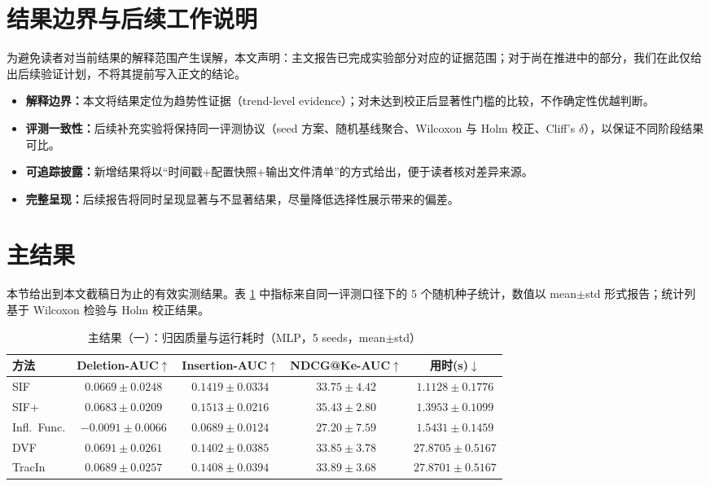 \section{结果边界与后续工作说明}
为避免读者对当前结果的解释范围产生误解，本文声明：主文报告已完成实验部分对应的证据范围；对于尚在推进中的部分，我们在此仅给出后续验证计划，不将其提前写入正文的结论。
\begin{itemize}
    \item \textbf{解释边界：}本文将结果定位为趋势性证据（trend-level evidence）；对未达到校正后显著性门槛的比较，不作确定性优越判断。
    \item \textbf{评测一致性：}后续补充实验将保持同一评测协议（seed 方案、随机基线聚合、Wilcoxon 与 Holm 校正、Cliff's $\delta$），以保证不同阶段结果可比。
    \item \textbf{可追踪披露：}新增结果将以“时间戳+配置快照+输出文件清单”的方式给出，便于读者核对差异来源。
    \item \textbf{完整呈现：}后续报告将同时呈现显著与不显著结果，尽量降低选择性展示带来的偏差。
\end{itemize}

\section{主结果}
本节给出到本文截稿日为止的有效实测结果。表 \ref{tab:main_result} 中指标来自同一评测口径下的 5 个随机种子统计，数值以 mean$\pm$std 形式报告；统计列基于 Wilcoxon 检验与 Holm 校正结果。

\begin{table}[htbp]
\centering
\caption{主结果（一）：归因质量与运行耗时（MLP，5 seeds，mean$\pm$std）}
\label{tab:main_result}
\small
\begin{tabular}{@{}lcccc@{}}
\toprule
方法 & Deletion-AUC$\uparrow$ & Insertion-AUC$\uparrow$ & NDCG@Ke-AUC$\uparrow$ & 用时(s)$\downarrow$ \\\midrule
SIF             & $0.0669\pm0.0248$ & $0.1419\pm0.0334$ & $33.75\pm4.42$ & $1.1128\pm0.1776$ \\
SIF+            & $0.0683\pm0.0209$ & $0.1513\pm0.0216$ & $35.43\pm2.80$ & $1.3953\pm0.1099$ \\
Infl.\ Func.    & $-0.0091\pm0.0066$ & $0.0689\pm0.0124$ & $27.20\pm7.59$ & $1.5431\pm0.1459$ \\
DVF             & $0.0691\pm0.0261$ & $0.1402\pm0.0385$ & $33.85\pm3.78$ & $27.8705\pm0.5167$ \\
TracIn          & $0.0689\pm0.0257$ & $0.1408\pm0.0394$ & $33.89\pm3.68$ & $27.8701\pm0.5167$ \\\bottomrule
\end{tabular}
\end{table}

